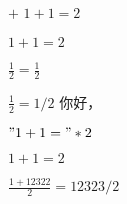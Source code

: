 $+$
$1+1 = 2$

$1+1 = 2$

$\frac{1}{2} = \frac{1}{2}$

$\frac{1}{2} = 1/2$
你好，

$" 1+1 ="*2$

$1+1 = 2$

$\frac{1+12322}{2} = 12323/2$

